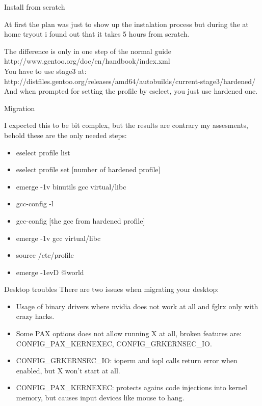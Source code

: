 \documentclass{beamer}
\begin{document}
\begin{frame}{Install from scratch}
	\begin{center}At first the plan was just to show up the instalation process but during the at home tryout i found out that it takes 5 hours from scratch.\end{center}
		The difference is only in one step of the normal guide http://www.gentoo.org/doc/en/handbook/index.xml \\
		You have to use stage3 at: http://distfiles.gentoo.org/releases/amd64/autobuilds/current-stage3/hardened/ \\
		And when prompted for setting the profile by eselect, you just use hardened one.
\end{frame}

\begin{frame}{Migration}
	\begin{center}I expected this to be bit complex, but the results are contrary my assesments, behold these are the only needed steps:\end{center}
	\begin{itemize}
		\item eselect profile list
		\item eselect profile set [number of hardened profile]
		\item emerge -1v binutils gcc virtual/libc
		\item gcc-config -l
		\item gcc-config [the gcc from hardened profile]
		\item emerge -1v gcc virtual/libc
		\item source /etc/profile
		\item emerge -1evD @world
	\end{itemize}
\end{frame}

\begin{frame}{Desktop troubles}
	There are two issues when migrating your desktop:
	\begin{itemize}
		\item Usage of binary drivers where nvidia does not work at all and fglrx only with crazy hacks.
		\item Some PAX options does not allow running X at all, broken features are: CONFIG\_PAX\_KERNEXEC, CONFIG\_GRKERNSEC\_IO.
	\end{itemize}
	\begin{itemize}
		\item CONFIG\_GRKERNSEC\_IO: ioperm and iopl calls return error when enabled, but X won't start at all.
		\item CONFIG\_PAX\_KERNEXEC: protects agains code injections into kernel memory, but causes input devices like mouse to hang.
	\end{itemize}
\end{frame}
\end{document}
